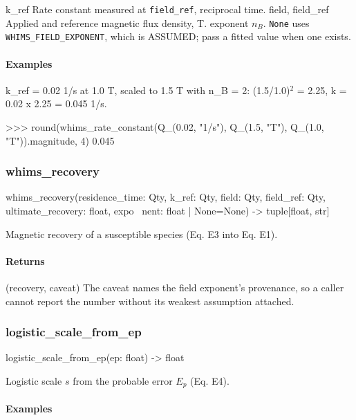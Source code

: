 \documentclass[10pt,a4paper,twoside]{report}
\begin{document}
k\_ref Rate constant measured at \texttt{field\_ref}, reciprocal time. field, field\_ref Applied and reference magnetic flux density, T. exponent $n_B$. \texttt{None} uses \texttt{WHIMS\_FIELD\_EXPONENT}, which is ASSUMED; pass a fitted value when one exists.

\paragraph*{Examples}

k\_ref = 0.02 1/s at 1.0 T, scaled to 1.5 T with n\_B = 2: (1.5/1.0)$^{2}$ = 2.25, k = 0.02 x 2.25 = 0.045 1/s.

\begin{doctestblock}
>>> round(whims_rate_constant(Q_(0.02, "1/s"), Q_(1.5, "T"), Q_(1.0, "T")).magnitude, 4)
0.045
\end{doctestblock}

\subsubsection*{whims\_recovery}

\begin{verbatimsmall}
whims_recovery(residence_time: Qty, k_ref: Qty, field: Qty, field_ref: Qty, ultimate_recovery: float, expo
    \ nent: float | None=None) -> tuple[float, str]
\end{verbatimsmall}

Magnetic recovery of a susceptible species (Eq. E3 into Eq. E1).

\paragraph*{Returns}

(recovery, caveat) The caveat names the field exponent's provenance, so a caller cannot report the number without its weakest assumption attached.

\subsubsection*{logistic\_scale\_from\_ep}

\begin{verbatimsmall}
logistic_scale_from_ep(ep: float) -> float
\end{verbatimsmall}

Logistic scale $s$ from the probable error $E_p$ (Eq. E4).

\paragraph*{Examples}
\end{document}
